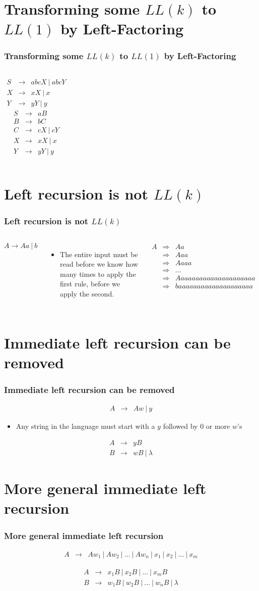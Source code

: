 \documentclass{beamer}
\newcommand{\arr}{&\rightarrow&}
\newcommand{\darr}{&\Rightarrow&}
\newcommand{\ar}{\rightarrow}
\newcommand{\bee}{\begin{eqnarray*}}
\newcommand{\eee}{\end{eqnarray*}}
\newcommand{\bi}{\begin{itemize}}
\newcommand{\li}{\item}
\newcommand{\ei}{\end{itemize}}
\newcommand{\sect}[1]{
\section{#1}
\begin{frame}[fragile]\frametitle{#1}
}
\begin{document}
\sect{Transforming some $LL(k)$ to $LL(1)$ by Left-Factoring}
\begin{columns}
\bee
S \arr abcX \ | \ abcY\\
X \arr xX \ | \ x\\
Y \arr yY \ | \ y
\eee
{}
\bee
S \arr aB\\
B \arr bC\\
C \arr cX \ | \ cY\\
X \arr xX \ | \ x\\
Y \arr yY \ | \ y
\eee
\end{columns}

\end{frame}

\sect{Left recursion is not $LL(k)$}
\begin{columns}
\[
A \ar Aa \ | \ b
\]
\bi
\li The entire input must be read before we know how many times to
apply the first rule, before we apply the second.
\ei
{}
\bee
A \darr Aa\\
  \darr Aaa\\
  \darr Aaaa\\
  \darr \ldots\\
  \darr Aaaaaaaaaaaaaaaaaaaaa\\
  \darr baaaaaaaaaaaaaaaaaaaa
\eee
\end{columns}

\end{frame}

\sect{Immediate left recursion can be removed}
\bee
A \arr Aw \ | \ y
\eee

\bi
\pause \li Any string in the language must start with a $y$ followed by 0 or
more $w$'s
\ei

\pause 
\bee
A \arr yB \\
B \arr wB \ | \ \lambda
\eee

\vfill

\end{frame}

\sect{More general immediate left recursion}
\bee
A \arr Aw_1 \ | \ Aw_2 \ | \ \ldots \ | \ Aw_{n} \ | \ x_1 \ | \ x_2
\ | \ \ldots \ | \ x_m
\eee

\pause 
\bee
A \arr x_1B \ | \ x_2B \ | \ \ldots \ | \ x_mB\\
B \arr w_1B \ | \ w_2B \ | \ \ldots \ | \ w_nB \ | \ \lambda
\eee

\vfill

\end{frame}
\end{document}

